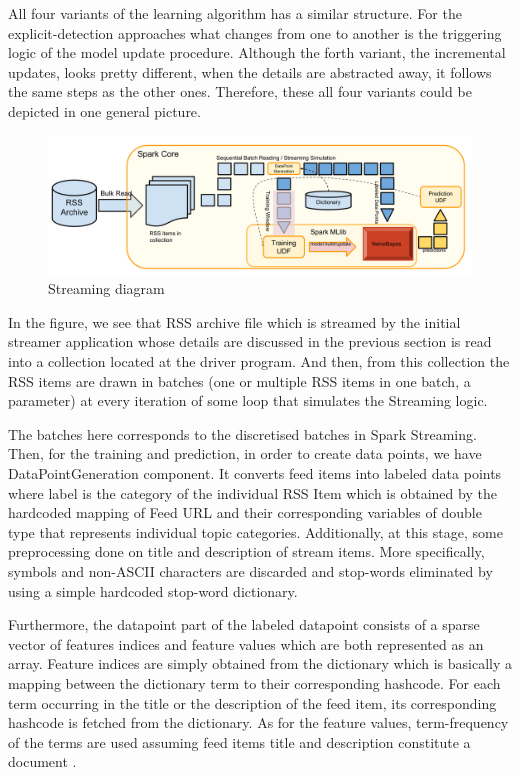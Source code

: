 \documentclass{article} %
\begin{document}
All four variants of the learning algorithm has a similar structure. For the explicit-detection approaches what changes from one to another is the triggering logic of the model update procedure. Although the forth variant, the incremental updates, looks pretty different, when the details are abstracted away, it follows the same steps as the other ones. Therefore, these all four variants could be depicted in one general picture.
\begin{figure}[htbp]
  \centering
  \includegraphics[scale=0.24]{./figures/streaming_diagram.png}
  \caption{Streaming diagram}
\end{figure}

In the figure, we see that RSS archive file which is streamed by the initial streamer application whose details are discussed in the previous section is read into a collection located at the driver program. And then, from this collection the RSS items are drawn in batches (one or multiple RSS items in one batch, a parameter) at every iteration of some loop that simulates the Streaming logic.

The batches here corresponds to the discretised batches in Spark Streaming. Then, for the training and prediction, in order to create data points, we have DataPointGeneration component. It converts feed items into labeled data points where label is the category of the individual RSS Item which is obtained by the hardcoded mapping of Feed URL and their corresponding variables of double type that represents individual topic categories. Additionally, at this stage, some preprocessing done on title and description of stream items. More specifically, symbols and non-ASCII characters are discarded and stop-words eliminated by using a simple hardcoded stop-word dictionary.  

Furthermore, the datapoint part of the labeled datapoint consists of a sparse vector of features indices and feature values which are both represented as an array. Feature indices are simply obtained from the dictionary which is basically a mapping between the dictionary term to their corresponding hashcode. For each term occurring in the title or the description of the feed item, its corresponding hashcode is fetched from the dictionary. As for the feature values, term-frequency of the terms are used assuming feed items title and description constitute a document . 
\end{document}
